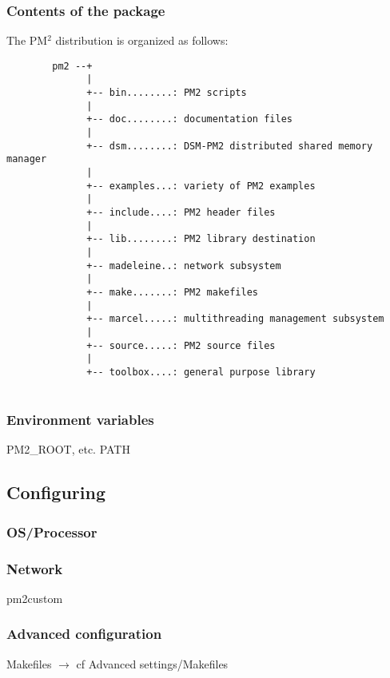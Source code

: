 \documentclass[a4paper,11pt]{article}
\def\pm2{PM$^2$\xspace}
\begin{document}
\subsubsection{Contents of the package}
The \pm2 distribution is organized as follows:
\begin{footnotesize}
\begin{verbatim}
        pm2 --+
              |
              +-- bin........: PM2 scripts
              |  
              +-- doc........: documentation files
              |
              +-- dsm........: DSM-PM2 distributed shared memory manager
              |
              +-- examples...: variety of PM2 examples
              |
              +-- include....: PM2 header files
              |
              +-- lib........: PM2 library destination
              |
              +-- madeleine..: network subsystem
              |
              +-- make.......: PM2 makefiles
              |
              +-- marcel.....: multithreading management subsystem
              |
              +-- source.....: PM2 source files
              |
              +-- toolbox....: general purpose library
              
\end{verbatim}
\end{footnotesize}
\subsubsection{Environment variables}
        PM2\_ROOT, etc.
        PATH

\subsection{Configuring}

\subsubsection{OS/Processor}

\subsubsection{Network}
        pm2custom

\subsubsection{Advanced configuration}
        Makefiles $\rightarrow$ cf Advanced settings/Makefiles
\end{document}
